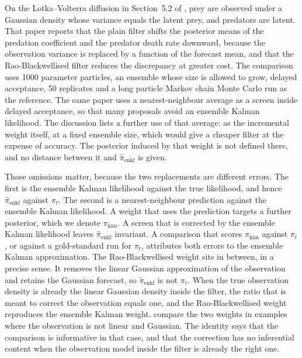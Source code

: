 On the Lotka--Volterra diffusion in Section~5.2 of \citet{golightly2026}, prey are observed under a Gaussian density whose variance equals the latent prey, and predators are latent. That paper reports that the plain filter shifts the posterior means of the predation coefficient and the predator death rate downward, because the observation variance is replaced by a function of the forecast mean, and that the Rao-Blackwellised filter reduces the discrepancy at greater cost. The comparison uses 1000 parameter particles, an ensemble whose size is allowed to grow, delayed acceptance, 50 replicates and a long particle Markov chain Monte Carlo run as the reference. The same paper uses a nearest-neighbour average as a screen inside delayed acceptance, so that many proposals avoid an ensemble Kalman likelihood. The discussion lists a further use of that average: as the incremental weight itself, at a fixed ensemble size, which would give a cheaper filter at the expense of accuracy. The posterior induced by that weight is not defined there, and no distance between it and \(\hat{\pi}_{\mathrm{enkf}}\) is given.

Those omissions matter, because the two replacements are different errors. The first is the ensemble Kalman likelihood against the true likelihood, and hence \(\hat{\pi}_{\mathrm{enkf}}\) against \(\pi_t\). The second is a nearest-neighbour prediction against the ensemble Kalman likelihood. A weight that uses the prediction targets a further posterior, which we denote \(\pi_{\mathrm{knn}}\). A screen that is corrected by the ensemble Kalman likelihood leaves \(\hat{\pi}_{\mathrm{enkf}}\) invariant. A comparison that scores \(\pi_{\mathrm{knn}}\) against \(\pi_t\), or against a gold-standard run for \(\pi_t\), attributes both errors to the ensemble Kalman approximation. The Rao-Blackwellised weight sits in between, in a precise sense. It removes the linear Gaussian approximation of the observation and retains the Gaussian forecast, so \(\tilde{\pi}_{\mathrm{enkf}}\) is not \(\pi_t\). When the true observation density is already the linear Gaussian density inside the filter, the ratio that is meant to correct the observation equals one, and the Rao-Blackwellised weight reproduces the ensemble Kalman weight. \citet{golightly2026} compare the two weights in examples where the observation is not linear and Gaussian. The identity says that the comparison is informative in that case, and that the correction has no inferential content when the observation model inside the filter is already the right one.

